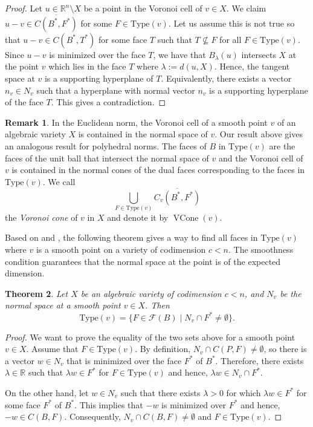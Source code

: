 \documentclass{article}
\newtheorem{theorem}{Theorem}
\numberwithin{theorem}{section}
\theoremstyle{definition}
\newtheorem{remark}[theorem]{Remark}
\theoremstyle{example_contd}
\newcommand{\F}{\mathcal{F}}
\newcommand{\RR}{\mathbb{R}}
\newcommand{\type}{\mathrm{Type}}
\DeclareMathOperator{\vc}{{VCone}}
\begin{document}
\begin{proof}
	Let $u \in \RR^n\setminus X$ be a point in the Voronoi cell of $v \in X.$ We claim $u-v\in \overline{C(B^*,F^*)}$ for some $F \in \type(v)$. Let us assume this is not true so that $u-v\in C(B^*,T^*)$ for some face $T$ 
	such that $T\not\subseteq F$ for all $F\in \type(v).$ Since $u-v$ is minimized over the face $T$, we have that $B_{\lambda}(u)$ intersects $X$ at the point $v$ which lies in the face $T$ where $\lambda:=d(u,X)$. Hence, the tangent space at $v$ is a supporting hyperplane of $T$. Equivalently, there exists a vector $n_v\in N_v$ such that a hyperplane with normal vector $n_v$ is a supporting hyperplane of the face $T.$ This gives a contradiction.
\end{proof}

	\begin{remark}
		In the Euclidean norm, the Voronoi cell of a smooth point $v$ of an algebraic variety $X$ is contained in the normal space of $v.$ Our result above gives an analogous result for polyhedral norms. The faces of $B$ in $\type(v)$ are the faces of the unit ball that intersect the normal space of $v$ and the Voronoi cell of $v$ is contained in the normal cones of the dual faces corresponding to the faces in $\type(v)$. We call $$\bigcup_{F\in\type(v)}\overline{C_v(B^*,F^*)}$$
        the \textit{Voronoi cone} of $v$ in $X$ and denote it by $\vc(v)$. 
	\end{remark}

Based on  and , the following theorem gives a way to find all faces in $\type(v)$ where $v$ is a smooth point on a variety of codimension $c<n$.
The smoothness condition 
guarantees that the normal space at the point is of the expected dimension.



	\begin{theorem}\label{thm:generalresult}
		Let $X$ be an algebraic variety of codimension $c<n$, and $N_v$ be the normal space at a smooth point $v\in X$. Then 
		\[\type(v)=\{F\in\F(B) \mid N_v\cap F^*\neq \emptyset \}.\]
		
			\end{theorem}

	
 \begin{proof}
		We want to prove the equality of the two sets above for a smooth point $v\in X$. 
		Assume that $F\in \type(v)$. By definition, $N_v\cap C(P,F)\neq \emptyset$, so there is a vector $w\in N_v$ that is minimized over the face $F^*$ of $B^*$. Therefore, there exists $\lambda\in \RR$ such that $\lambda w\in F^*$ for $F\in\type(v)$ and hence, $\lambda w\in N_v\cap F^*$. 
		
		On the other hand, let $w\in N_v$ such that there exists $\lambda>0$ for which $\lambda w\in F^*$ for some face $F^*$ of $B^*.$ This implies that $-w$ is minimized over $F^*$ and hence, $-w\in C(B,F)$. Consequently, $N_v\cap C(B,F)\neq \emptyset$ and $F\in \type(v).$
	\end{proof}
	
\end{document}
